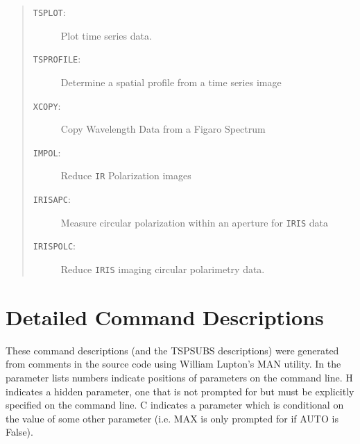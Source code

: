 \documentclass[11pt,twoside]{article}
\renewcommand{\_}{\texttt{\symbol{95}}}
\newenvironment{mansectionroutines}{\begin{quote}\begin{description}}%
{\end{description}\end{quote}}
\newcommand{\mansectionitem}[1]{\item[#1:]\mbox{}}
\newcommand{\mantt}{\tt}
\begin{document}
\begin{mansectionroutines}
\mansectionitem{{\mantt{TSPLOT}}}
        Plot time series data.

\mansectionitem{{\mantt{TSPROFILE}}}
        Determine a spatial profile from a time series image

\mansectionitem{{\mantt{XCOPY}}}
        Copy Wavelength Data from a Figaro Spectrum

\mansectionitem{{\mantt{IMPOL}}}
        Reduce {\mantt{IR}} Polarization images

\mansectionitem{{\mantt{IRISAPC}}}
        Measure circular polarization within an aperture for {\mantt{IRIS}} data

\mansectionitem{{\mantt{IRISPOLC}}}
        Reduce {\mantt{IRIS}} imaging circular polarimetry data.

\end{mansectionroutines}



\newpage

\section{Detailed Command Descriptions}

These command descriptions (and the TSPSUBS descriptions) were generated from
comments in the source code using William Lupton's MAN utility. In the
parameter lists numbers indicate positions of parameters on the command
line. H indicates a hidden parameter, one that is not prompted for but must
be explicitly specified on the command line. C indicates a parameter which
is conditional on the value of some other parameter (i.e. MAX is only prompted
for if AUTO is False).
\end{document}
